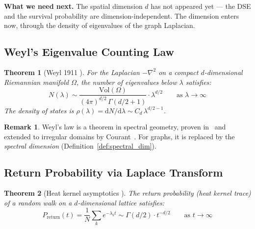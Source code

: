 \documentclass[11pt,a4paper]{article}
\newtheorem{theorem}{Theorem}[section]
\theoremstyle{definition}
\newtheorem*{remark}{Remark}
\newcommand{\dd}{\mathrm{d}}
\newcommand{\Preturn}{P_{\mathrm{return}}}
\begin{document}
\noindent\textbf{What we need next.} The spatial dimension $d$ has not
appeared yet --- the DSE and the survival probability are
dimension-independent. The dimension enters now, through the density
of eigenvalues of the graph Laplacian.

\subsection{Weyl's Eigenvalue Counting Law}

\begin{theorem}[Weyl 1911 {\cite{weyl1911}}]
\label{thm:weyl}
For the Laplacian $-\nabla^2$ on a compact $d$-dimensional Riemannian
manifold $\Omega$, the number of eigenvalues below $\lambda$ satisfies:
\begin{equation}
N(\lambda) \sim \frac{\mathrm{Vol}(\Omega)}{(4\pi)^{d/2}\,\Gamma(d/2+1)} \cdot \lambda^{d/2}
\qquad\text{as } \lambda \to \infty
\label{eq:weyl}
\end{equation}
The density of states is $\rho(\lambda) = \dd N/\dd\lambda \sim C_d\, \lambda^{d/2 - 1}$.
\end{theorem}

\begin{remark}
Weyl's law is a theorem in spectral geometry, proven
in~\cite{weyl1911} and extended to irregular domains by
Courant~\cite{courant1924}. For graphs, it is replaced by the
\emph{spectral dimension} (Definition~\ref{def:spectral_dim}).
\end{remark}

\subsection{Return Probability via Laplace Transform}

\begin{theorem}[Heat kernel asymptotics {\cite{grigoryan2009}}]
\label{thm:return}
The return probability (heat kernel trace) of a random walk on a
$d$-dimensional lattice satisfies:
\begin{equation}
\Preturn(t) = \frac{1}{N}\sum_k e^{-\lambda_k t}
\sim \Gamma(d/2) \cdot t^{-d/2}
\qquad\text{as } t \to \infty
\label{eq:return}
\end{equation}
\end{theorem}
\end{document}
